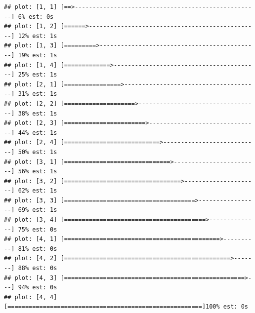 \documentclass[
]{article}
\newenvironment{Shaded}{\begin{snugshade}}{\end{snugshade}}
\newcommand{\AttributeTok}[1]{\textcolor[rgb]{0.13,0.29,0.53}{#1}}
\newcommand{\DocumentationTok}[1]{\textcolor[rgb]{0.56,0.35,0.01}{\textbf{\textit{#1}}}}
\newcommand{\FunctionTok}[1]{\textcolor[rgb]{0.13,0.29,0.53}{\textbf{#1}}}
\newcommand{\NormalTok}[1]{#1}
\newcommand{\SpecialCharTok}[1]{\textcolor[rgb]{0.81,0.36,0.00}{\textbf{#1}}}
\newcommand{\StringTok}[1]{\textcolor[rgb]{0.31,0.60,0.02}{#1}}
\begin{document}
\begin{Shaded}
\end{Shaded}

\begin{verbatim}
## plot: [1, 1] [==>----------------------------------------------------] 6% est: 0s
## plot: [1, 2] [======>------------------------------------------------] 12% est: 1s
## plot: [1, 3] [=========>---------------------------------------------] 19% est: 1s
## plot: [1, 4] [=============>-----------------------------------------] 25% est: 1s
## plot: [2, 1] [================>--------------------------------------] 31% est: 1s
## plot: [2, 2] [====================>----------------------------------] 38% est: 1s
## plot: [2, 3] [=======================>-------------------------------] 44% est: 1s
## plot: [2, 4] [===========================>---------------------------] 50% est: 1s
## plot: [3, 1] [==============================>------------------------] 56% est: 1s
## plot: [3, 2] [=================================>---------------------] 62% est: 1s
## plot: [3, 3] [=====================================>-----------------] 69% est: 1s
## plot: [3, 4] [========================================>--------------] 75% est: 0s
## plot: [4, 1] [============================================>----------] 81% est: 0s
## plot: [4, 2] [===============================================>-------] 88% est: 0s
## plot: [4, 3] [===================================================>---] 94% est: 0s
## plot: [4, 4] [=======================================================]100% est: 0s
\end{verbatim}
\end{document}
